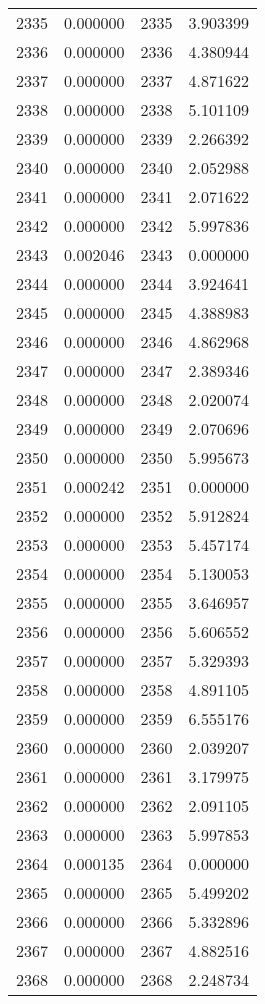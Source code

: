 \documentclass[12pt]{article}
\begin{document}
\begin{longtable}{@{}cccc@{}}
2335 & 0.000000 & 2335 & 3.903399 \\
2336 & 0.000000 & 2336 & 4.380944 \\
2337 & 0.000000 & 2337 & 4.871622 \\
2338 & 0.000000 & 2338 & 5.101109 \\
2339 & 0.000000 & 2339 & 2.266392 \\
2340 & 0.000000 & 2340 & 2.052988 \\
2341 & 0.000000 & 2341 & 2.071622 \\
2342 & 0.000000 & 2342 & 5.997836 \\
2343 & 0.002046 & 2343 & 0.000000 \\
2344 & 0.000000 & 2344 & 3.924641 \\
2345 & 0.000000 & 2345 & 4.388983 \\
2346 & 0.000000 & 2346 & 4.862968 \\
2347 & 0.000000 & 2347 & 2.389346 \\
2348 & 0.000000 & 2348 & 2.020074 \\
2349 & 0.000000 & 2349 & 2.070696 \\
2350 & 0.000000 & 2350 & 5.995673 \\
2351 & 0.000242 & 2351 & 0.000000 \\
2352 & 0.000000 & 2352 & 5.912824 \\
2353 & 0.000000 & 2353 & 5.457174 \\
2354 & 0.000000 & 2354 & 5.130053 \\
2355 & 0.000000 & 2355 & 3.646957 \\
2356 & 0.000000 & 2356 & 5.606552 \\
2357 & 0.000000 & 2357 & 5.329393 \\
2358 & 0.000000 & 2358 & 4.891105 \\
2359 & 0.000000 & 2359 & 6.555176 \\
2360 & 0.000000 & 2360 & 2.039207 \\
2361 & 0.000000 & 2361 & 3.179975 \\
2362 & 0.000000 & 2362 & 2.091105 \\
2363 & 0.000000 & 2363 & 5.997853 \\
2364 & 0.000135 & 2364 & 0.000000 \\
2365 & 0.000000 & 2365 & 5.499202 \\
2366 & 0.000000 & 2366 & 5.332896 \\
2367 & 0.000000 & 2367 & 4.882516 \\
2368 & 0.000000 & 2368 & 2.248734 \\

\end{longtable}
\end{document}
